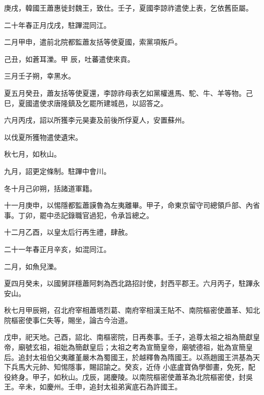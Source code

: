 \begin{pinyinscope}
 庚戌，韓國王蕭惠徙封魏王，致仕。壬子，夏國李諒祚遣使上表，乞依舊臣屬。



 二十年春正月戊戌，駐蹕混同江。



 二月甲申，遣前北院都監蕭友括等使夏國，索黨項叛戶。



 己丑，如蒼耳濼。甲
 辰，吐蕃遣使來貢。



 三月壬子朔，幸黑水。



 夏五月癸丑，蕭友括等使夏還，李諒祚母表乞如黨權進馬、駝、牛、羊等物。己巳，夏國遣使求唐隆鎮及乞罷所建城邑，以詔答之。



 六月丙戌，詔以所獲李元昊妻及前後所俘夏人，安置蘇州。



 以伐夏所獲物遣使遺宋。



 秋七月，如秋山。



 九月，詔更定條制。駐蹕中會川。



 冬十月己卯朔，括諸道軍籍。



 十一月庚申，以惕隱都監蕭謨魯為左夷離畢。甲子，命東京留守司總領戶部、內省事。丁卯，罷中丞記錄職官過犯，令承旨總之。



 十二月乙酉，以皇太后行再生禮，肆赦。



 二十一年春正月辛亥，如混同江。



 二月，如魚兒濼。



 夏四月癸未，以國舅詳穩蕭阿刺為西北路招討使，封西平郡王。六月丙子，駐蹕永安山。



 秋七月甲辰朔，召北府宰相蕭塔烈葛、南府宰相漢王貼不、南院樞密使蕭革、知北院樞密使事仁失等，賜坐，論古今治道。



 戊申，祀天地。己酉，詔北、南樞密院，日再奏事。壬子，追尊太祖之祖為簡獻皇帝，廟號玄祖，祖妣為簡獻皇后；太祖之考為宣簡皇帝，廟號德祖，妣為宣簡皇后。追封太祖伯父夷離堇嚴木為蜀國王，於越釋魯為隋國王。以燕趙國王洪基為天下兵馬大元帥、知惕隱事，賜詔諭之。癸亥，近侍
 小底盧寶偽學御畫，免死，配役終身。甲子，如秋山。戊辰，謁慶陵。以南院樞密使蕭革為北院樞密使，封吳王。辛未，如慶州。壬申，追封太祖弟寅底石為許國王。




\end{pinyinscope}
